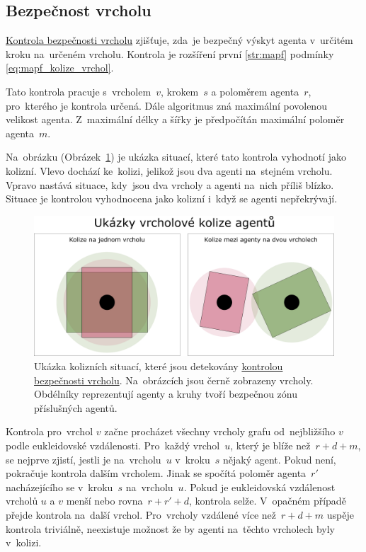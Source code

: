 \subsection{Bezpečnost vrcholu}\label{subsec:bezpecnost_vrcholu}


\hyperref[subsec:bezpecnost_vrcholu]{Kontrola bezpečnosti vrcholu} zjišťuje,
zda~je bezpečný výskyt agenta v~určitém kroku na~určeném vrcholu.
Kontrola je rozšíření první \ref{str:mapf} podmínky
 \eqref{eq:mapf_kolize_vrchol}.

Tato kontrola pracuje s~vrcholem~$v$, krokem~$s$ a poloměrem agenta~$r$, pro~kterého je kontrola určená.
Dále algoritmus zná maximální povolenou velikost agenta.
Z~maximální délky a šířky je předpočítán maximální poloměr agenta~$m$.

Na~obrázku (Obrázek~\ref{fig:kolize_na_vrcholu}) je ukázka situací, které tato kontrola vyhodnotí jako kolizní.
Vlevo dochází ke~kolizi, jelikož jsou dva agenti na~stejném vrcholu.
Vpravo nastává situace, kdy~jsou dva vrcholy a agenti na~nich příliš blízko.
Situace je kontrolou vyhodnocena jako kolizní i~když se agenti nepřekrývají.

\begin{figure}[h]
	\centering
	\includegraphics[width=\textwidth]{../img/kolize_vrchol}
	\caption{
		Ukázka kolizních situací, které jsou detekovány \hyperref[subsec:bezpecnost_vrcholu]{kontrolou bezpečnosti vrcholu}.
		Na~obrázcích jsou černě zobrazeny vrcholy.
		Obdélníky reprezentují agenty a kruhy tvoří bezpečnou zónu příslušných agentů.
	}
	\label{fig:kolize_na_vrcholu}
\end{figure}

Kontrola pro~vrchol $v$ začne procházet všechny vrcholy grafu od~nejbližšího $v$ podle eukleidovské vzdálenosti.
Pro~každý vrchol~$u$, který je blíže než~$r + d + m$, se nejprve zjistí,
jestli je na~vrcholu~$u$ v~kroku~$s$ nějaký agent.
Pokud není, pokračuje kontrola dalším vrcholem.
Jinak se spočítá poloměr agenta~$r'$ nacházejícího se v~kroku~$s$ na~vrcholu~$u$.
Pokud je eukleidovská vzdálenost vrcholů $u$ a $v$ menší nebo rovna~$r + r' + d$, kontrola selže.
V~opačném případě přejde kontrola na~další vrchol.
Pro~vrcholy vzdálené více než~$r + d + m$ uspěje kontrola triviálně,
neexistuje možnost že by agenti na~těchto vrcholech byly v~kolizi.

